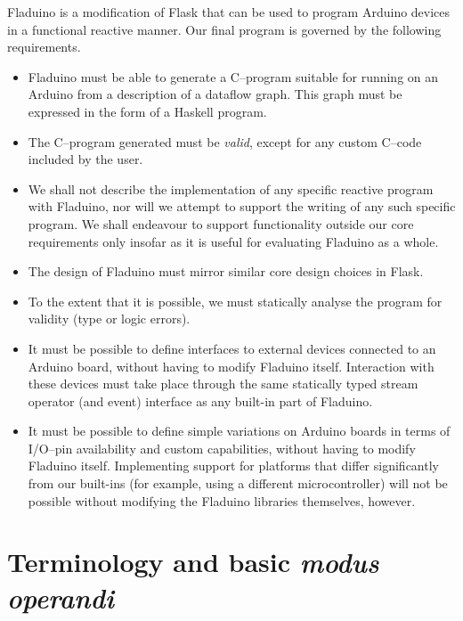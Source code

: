 \documentclass[a4paper, oneside, final]{memoir}
\begin{document}
Fladuino is a modification of Flask that can be used to program
Arduino devices in a functional reactive manner.  Our final program is
governed by the following requirements.

\begin{itemize}
\item Fladuino must be able to generate a C--program suitable for
  running on an Arduino from a description of a dataflow graph.  This
  graph must be expressed in the form of a Haskell program.
\item The C--program generated must be \textit{valid}, except for any
  custom C--code included by the user.
\item We shall not describe the implementation of any specific
  reactive program with Fladuino, nor will we attempt to support the
  writing of any such specific program.  We shall endeavour to support
  functionality outside our core requirements only insofar as it is
  useful for evaluating Fladuino as a whole.
\item The design of Fladuino must mirror similar core design choices
  in Flask.
\item To the extent that it is possible, we must statically analyse
  the program for validity (type or logic errors).
\item It must be possible to define interfaces to external devices
  connected to an Arduino board, without having to modify Fladuino
  itself.  Interaction with these devices must take place through the
  same statically typed stream operator (and event) interface as any
  built-in part of Fladuino.
\item It must be possible to define simple variations on Arduino
  boards in terms of I/O--pin availability and custom capabilities,
  without having to modify Fladuino itself.  Implementing support for
  platforms that differ significantly from our built-ins (for example,
  using a different microcontroller) will not be possible without
  modifying the Fladuino libraries themselves, however.
\end{itemize}

\section{Terminology and basic \textit{modus operandi}}
\end{document}
